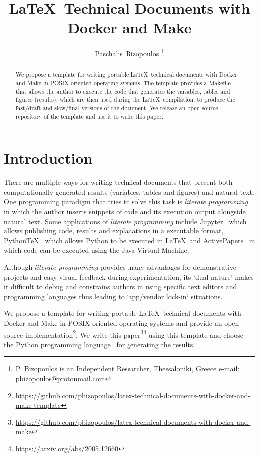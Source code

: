 \documentclass[journal]{IEEEtran}
\begin{document}

\title{\LaTeX\ Technical Documents with Docker and Make}

\author{Paschalis~Bizopoulos
\thanks{P. Bizopoulos is an Independent Researcher, Thessaloniki, Greece e-mail: pbizopoulos@protonmail.com}}

\maketitle

\begin{abstract}
	We propose a template for writing portable \LaTeX\ technical documents with Docker and Make in POSIX-oriented operating systems.
	The template provides a Makefile that allows the author to execute the code that generates the variables, tables and figures (results), which are then used during the \LaTeX\ compilation, to produce the fast/draft and slow/final versions of the document.
	We release an open source repository of the template and use it to write this paper.
\end{abstract}

\section{Introduction}
There are multiple ways for writing technical documents that present both computationally generated results (variables, tables and figures) and natural text.
One programming paradigm that tries to solve this task is \textit{literate programming}~\cite{knuth1984literate} in which the author inserts snippets of code and its execution output alongside natural text.
Some applications of \textit{literate programming} include Jupyter~\cite{kluyver2016jupyter} which allows publishing code, results and explanations in a executable format, PythonTeX~\cite{poore2015pythontex} which allows Python to be executed in \LaTeX\ and ActivePapers~\cite{hinsen2014activepapers} in which code can be executed using the Java Virtual Machine.

Although \textit{literate programming} provides many advantages for demonstrative projects and easy visual feedback during experimentation, its `dual nature' makes it difficult to debug and constrains authors in using specific text editors and programming languages thus leading to `app/vendor lock-in` situations.

We propose a template for writing portable \LaTeX\ technical documents with Docker and Make in POSIX-oriented operating systems and provide an open source implementation\footnote{\url{https://github.com/pbizopoulos/latex-technical-documents-with-docker-and-make-template}}.
We write this paper\footnote{\url{https://github.com/pbizopoulos/latex-technical-documents-with-docker-and-make}}\footnote{\url{https://arxiv.org/abs/2005.12660}} using this template and choose the Python programming language~\cite{van2007python} for generating the results.
\end{document}
